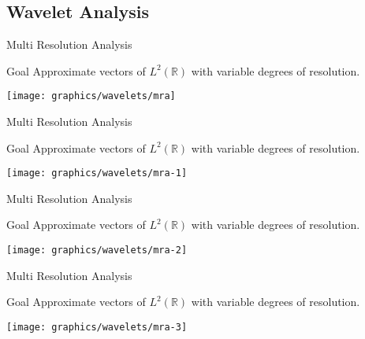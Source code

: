 \subsection{Wavelet Analysis}

    \begin{frame}{Multi Resolution Analysis}
        \begin{description}
            \item<1->\begin{block}{Goal}
                Approximate vectors of $L^2\left(\mathbb{R}\right)$ with variable degrees of resolution.
            \end{block}
            \item<2->\texttt{[image: graphics/wavelets/mra]}
        \end{description}
    \end{frame}

    \begin{frame}{Multi Resolution Analysis}
        \begin{description}
            \item<1->\begin{block}{Goal}
                Approximate vectors of $L^2\left(\mathbb{R}\right)$ with variable degrees of resolution.
            \end{block}
            \item<1->\texttt{[image: graphics/wavelets/mra-1]}
        \end{description}
    \end{frame}

    \begin{frame}{Multi Resolution Analysis}
        \begin{description}
            \item<1->\begin{block}{Goal}
                Approximate vectors of $L^2\left(\mathbb{R}\right)$ with variable degrees of resolution.
            \end{block}
            \item<1->\texttt{[image: graphics/wavelets/mra-2]}
        \end{description}
    \end{frame}

    \begin{frame}{Multi Resolution Analysis}
        \begin{description}
            \item<1->\begin{block}{Goal}
                Approximate vectors of $L^2\left(\mathbb{R}\right)$ with variable degrees of resolution.
            \end{block}
            \item<1->\texttt{[image: graphics/wavelets/mra-3]}
        \end{description}
    \end{frame}

